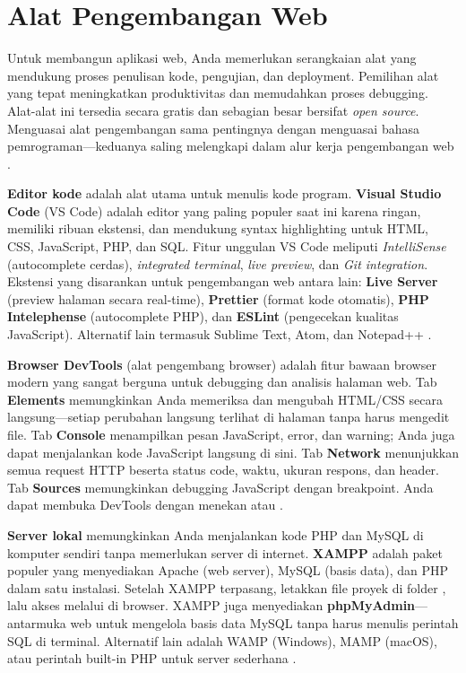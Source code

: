 ﻿\section{Alat Pengembangan Web}
Untuk membangun aplikasi web, Anda memerlukan serangkaian alat yang mendukung proses penulisan kode, pengujian, dan deployment. Pemilihan alat yang tepat meningkatkan produktivitas dan memudahkan proses debugging. Alat-alat ini tersedia secara gratis dan sebagian besar bersifat \textit{open source}. Menguasai alat pengembangan sama pentingnya dengan menguasai bahasa pemrograman---keduanya saling melengkapi dalam alur kerja pengembangan web \cite{mdnLearn}.

\textbf{Editor kode} adalah alat utama untuk menulis kode program. \textbf{Visual Studio Code} (VS Code) adalah editor yang paling populer saat ini karena ringan, memiliki ribuan ekstensi, dan mendukung syntax highlighting untuk HTML, CSS, JavaScript, PHP, dan SQL. Fitur unggulan VS Code meliputi \textit{IntelliSense} (autocomplete cerdas), \textit{integrated terminal}, \textit{live preview}, dan \textit{Git integration}. Ekstensi yang disarankan untuk pengembangan web antara lain: \textbf{Live Server} (preview halaman secara real-time), \textbf{Prettier} (format kode otomatis), \textbf{PHP Intelephense} (autocomplete PHP), dan \textbf{ESLint} (pengecekan kualitas JavaScript). Alternatif lain termasuk Sublime Text, Atom, dan Notepad++ \cite{w3schoolsTutorials}.

\textbf{Browser DevTools} (alat pengembang browser) adalah fitur bawaan browser modern yang sangat berguna untuk debugging dan analisis halaman web. Tab \textbf{Elements} memungkinkan Anda memeriksa dan mengubah HTML/CSS secara langsung---setiap perubahan langsung terlihat di halaman tanpa harus mengedit file. Tab \textbf{Console} menampilkan pesan JavaScript, error, dan warning; Anda juga dapat menjalankan kode JavaScript langsung di sini. Tab \textbf{Network} menunjukkan semua request HTTP beserta status code, waktu, ukuran respons, dan header. Tab \textbf{Sources} memungkinkan debugging JavaScript dengan breakpoint. Anda dapat membuka DevTools dengan menekan  atau  \cite{mdnToolsTesting}.

\textbf{Server lokal} memungkinkan Anda menjalankan kode PHP dan MySQL di komputer sendiri tanpa memerlukan server di internet. \textbf{XAMPP} adalah paket populer yang menyediakan Apache (web server), MySQL (basis data), dan PHP dalam satu instalasi. Setelah XAMPP terpasang, letakkan file proyek di folder , lalu akses melalui  di browser. XAMPP juga menyediakan \textbf{phpMyAdmin}---antarmuka web untuk mengelola basis data MySQL tanpa harus menulis perintah SQL di terminal. Alternatif lain adalah WAMP (Windows), MAMP (macOS), atau perintah built-in PHP  untuk server sederhana \cite{phpManual}.

